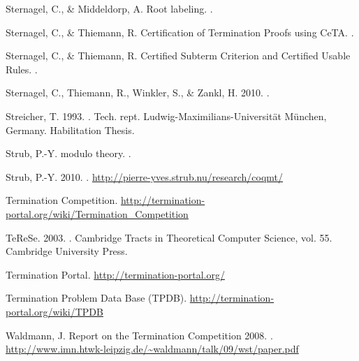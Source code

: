 \begin{thebibliography}{}
Sternagel, C., \& Middeldorp, A.
\newblock Root labeling.
.

Sternagel, C., \& Thiemann, R.
\newblock Certification of Termination Proofs using {CeTA}.
.

Sternagel, C., \& Thiemann, R.
\newblock Certified Subterm Criterion and Certified Usable Rules.
.

Sternagel, C., Thiemann, R., Winkler, S., \& Zankl, H. 2010.
.


Streicher, T. 1993.
.
\newblock Tech. rept. Ludwig-Maximilians-Universit\"at M\"unchen, Germany.
\newblock Habilitation Thesis.

Strub, P.-Y.
 modulo theory.
.

Strub, P.-Y. 2010.
.
\newblock \url{http://pierre-yves.strub.nu/research/coqmt/}

\newblock Termination Competition.
\newblock \url{http://termination-portal.org/wiki/Termination\_Competition}

{TeReSe}. 2003.
.
\newblock Cambridge Tracts in Theoretical Computer Science, vol. 55.
\newblock Cambridge University Press.

\newblock Termination Portal.
\newblock \url{http://termination-portal.org/}

\newblock Termination Problem Data Base (TPDB).
\newblock \url{http://termination-portal.org/wiki/TPDB}

Waldmann, J.
\newblock Report on the Termination Competition 2008.
.
\newblock \url{http://www.imn.htwk-leipzig.de/~waldmann/talk/09/wst/paper.pdf}


\end{thebibliography}

